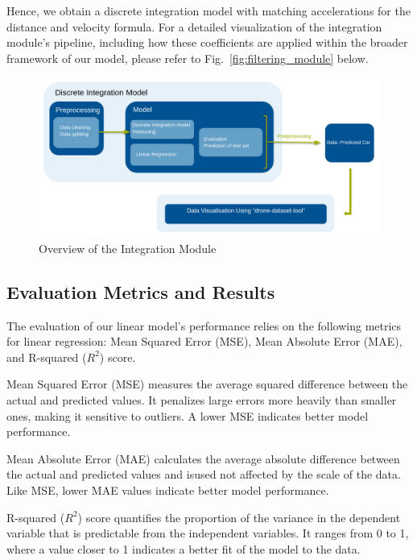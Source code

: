 Hence, we obtain a discrete integration model with matching accelerations for the distance and velocity formula. For a detailed visualization of the integration module's pipeline, including how these coefficients are applied within the broader framework of our model, please refer to Fig.~\ref{fig:filtering_module} below.

\begin{figure}[h]
\centering
\includegraphics[width=\columnwidth]{./images/figures/integration_module.png}
\caption{Overview of the Integration Module}
\label{fig:Integration_module}
\end{figure}


\subsection{Evaluation Metrics and Results}

The evaluation of our linear model's performance relies on the following metrics for linear regression: Mean Squared Error (MSE), Mean Absolute Error (MAE), and R-squared ($R^2$) score.

Mean Squared Error (MSE) measures the average squared difference between the actual and predicted values. It penalizes large errors more heavily than smaller ones, making it sensitive to outliers. A lower MSE indicates better model performance.

Mean Absolute Error (MAE) calculates the average absolute difference between the actual and predicted values and isused  
not affected by the scale of the data. Like MSE, lower MAE values indicate better model performance.

R-squared ($R^2$) score quantifies the proportion of the variance in the dependent variable that is predictable 
from the independent variables. 
It ranges from 0 to 1, where a value closer to 1 indicates a better fit of the model to the data. 

